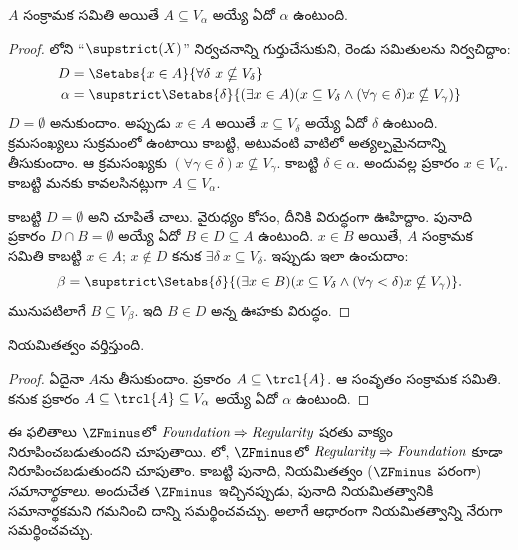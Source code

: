 \documentclass[../../../include/open-logic-section]{subfiles}
\begin{document}
\begin{lem}
$A$ సంక్రామక సమితి అయితే $A \subseteq V_\alpha$ అయ్యే ఏదో $\alpha$ ఉంటుంది.
\end{lem}

\begin{proof}
లోని ``$\supstrict(X)$'' నిర్వచనాన్ని గుర్తుచేసుకుని, రెండు సమితులను నిర్వచిద్దాం:
\begin{align*}
	D  &= \Setabs{x \in A}{\forall \delta\ x \nsubseteq V_\delta}\\
	\alpha &= \supstrict\Setabs{\delta}{(\exists x \in A)
	(x \subseteq V_\delta \land (\forall \gamma \in \delta)x \nsubseteq V_\gamma)}
\end{align*}
$D = \emptyset$ అనుకుందాం. అప్పుడు $x \in A$ అయితే
$x \subseteq V_\delta$ అయ్యే ఏదో $\delta$ ఉంటుంది.
క్రమసంఖ్యలు సుక్రమంలో ఉంటాయి కాబట్టి, అటువంటి వాటిలో
అత్యల్పమైనదాన్ని తీసుకుందాం. ఆ క్రమసంఖ్యకు
$(\forall \gamma \in \delta)x \nsubseteq V_\gamma$.
కాబట్టి $\delta \in \alpha$. అందువల్ల
 ప్రకారం
$x \in V_\alpha$. కాబట్టి మనకు కావలసినట్లుగా $A \subseteq V_{\alpha}$.

కాబట్టి $D = \emptyset$ అని చూపితే చాలు. వైరుధ్యం కోసం, దీనికి విరుద్ధంగా
ఊహిద్దాం. పునాది ప్రకారం $D \cap B
= \emptyset$ అయ్యే ఏదో $B \in D \subseteq A$ ఉంటుంది. $x \in B$ అయితే, $A$ సంక్రామక సమితి కాబట్టి $x \in A$; $x \notin D$ కనుక $\exists \delta\ x \subseteq
V_\delta$. ఇప్పుడు ఇలా ఉంచుదాం:
\[
	\beta = \supstrict\Setabs{\delta}{(\exists x \in B)(x \subseteq V_\delta \land (\forall \gamma < \delta)x \nsubseteq V_\gamma)}.
\]
మునుపటిలాగే $B \subseteq V_\beta$. ఇది $B \in D$ అన్న ఊహకు విరుద్ధం.
\end{proof}

\begin{thm}
నియమితత్వం వర్తిస్తుంది.
\end{thm}

\begin{proof}
ఏదైనా $A$ను తీసుకుందాం.  ప్రకారం
$A \subseteq \trcl{A}$. ఆ సంవృతం సంక్రామక సమితి.
కనుక  ప్రకారం
$A \subseteq \trcl{A} \subseteq V_\alpha$ అయ్యే ఏదో $\alpha$ ఉంటుంది.
\end{proof}

ఈ ఫలితాలు $\ZFminus$లో $\emph{Foundation}\Rightarrow\emph{Regularity}$ షరతు వాక్యం నిరూపించబడుతుందని చూపుతాయి. లో, $\ZFminus$లో $\emph{Regularity}\Rightarrow\emph{Foundation}$ కూడా నిరూపించబడుతుందని చూపుతాం. కాబట్టి పునాది, నియమితత్వం ($\ZFminus$ పరంగా) \emph{సమానార్థకాలు}. అందుచేత $\ZFminus$ ఇచ్చినప్పుడు, పునాది నియమితత్వానికి సమానార్థకమని గమనించి దాన్ని సమర్థించవచ్చు. అలాగే \stageshier{} ఆధారంగా నియమితత్వాన్ని నేరుగా సమర్థించవచ్చు.
\end{document}

